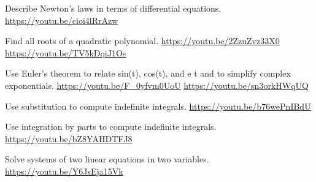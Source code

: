 \begin{readinessAssuranceResources}
\item Describe Newton’s laws in terms of differential equations. \url{https://youtu.be/cioi4lRrAzw}
\item Find all roots of a quadratic polynomial. \url{https://youtu.be/2ZzuZvz33X0} \url{https://youtu.be/TV5kDqiJ1Os}
\item Use Euler’s theorem to relate sin(t), cos(t), and e t  and to simplify complex exponentials.  \url{https://youtu.be/F_0yfvm0UoU} \url{https://youtu.be/sn3orkHWqUQ}
\item Use substitution to compute indefinite integrals. \url{https://youtu.be/b76wePnIBdU}
\item Use integration by parts to compute indefinite integrals. \url{https://youtu.be/bZ8YAHDTFJ8}
\item Solve systems of two linear equations in two variables.  \url{https://youtu.be/Y6JsEja15Vk}

\end{readinessAssuranceResources}
